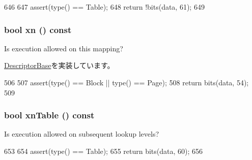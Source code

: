 \begin{DoxyCode}
646         {
647             assert(type() == Table);
648             return !bits(data, 61);
649         }
\end{DoxyCode}
\hypertarget{classArmISA_1_1TableWalker_1_1LongDescriptor_a88a5985b2a6224e7b546fa088b101d66}{
\subsubsection[{xn}]{\setlength{\rightskip}{0pt plus 5cm}bool xn () const}}
\label{classArmISA_1_1TableWalker_1_1LongDescriptor_a88a5985b2a6224e7b546fa088b101d66}
Is execution allowed on this mapping? 

\hyperlink{classArmISA_1_1TableWalker_1_1DescriptorBase_a92c5947cbc7259f6e536de82f5b33e4f}{DescriptorBase}を実装しています。


\begin{DoxyCode}
506         {
507             assert(type() == Block || type() == Page);
508             return bits(data, 54);
509         }
\end{DoxyCode}
\hypertarget{classArmISA_1_1TableWalker_1_1LongDescriptor_a918336097d9455741b30786d6e46f73d}{
\subsubsection[{xnTable}]{\setlength{\rightskip}{0pt plus 5cm}bool xnTable () const}}
\label{classArmISA_1_1TableWalker_1_1LongDescriptor_a918336097d9455741b30786d6e46f73d}
Is execution allowed on subsequent lookup levels? 


\begin{DoxyCode}
653         {
654             assert(type() == Table);
655             return bits(data, 60);
656         }
\end{DoxyCode}


